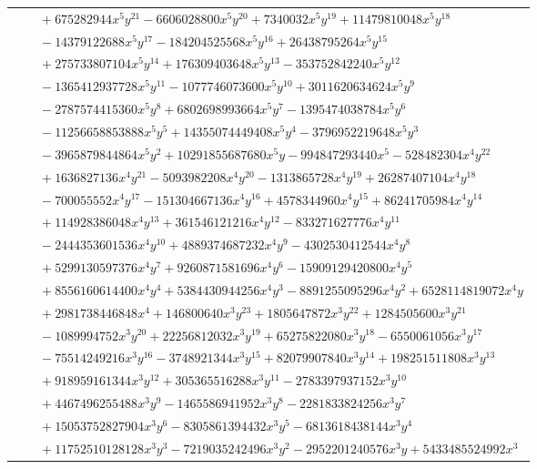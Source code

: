 \documentclass[11pt]{article}
\begin{document}
\begin{longtable}{@{}ll@{}}
 & $\quad +675282944x^{5}y^{21}-6606028800x^{5}y^{20}+7340032x^{5}y^{19}+11479810048x^{5}y^{18}$\\
 & $\quad -14379122688x^{5}y^{17}-184204525568x^{5}y^{16}+26438795264x^{5}y^{15}$\\
 & $\quad +275733807104x^{5}y^{14}+176309403648x^{5}y^{13}-353752842240x^{5}y^{12}$\\
 & $\quad -1365412937728x^{5}y^{11}-1077746073600x^{5}y^{10}+3011620634624x^{5}y^{9}$\\
 & $\quad -2787574415360x^{5}y^{8}+6802698993664x^{5}y^{7}-1395474038784x^{5}y^{6}$\\
 & $\quad -11256658853888x^{5}y^{5}+14355074449408x^{5}y^{4}-3796952219648x^{5}y^{3}$\\
 & $\quad -3965879844864x^{5}y^{2}+10291855687680x^{5}y-994847293440x^{5}-528482304x^{4}y^{22}$\\
 & $\quad +1636827136x^{4}y^{21}-5093982208x^{4}y^{20}-1313865728x^{4}y^{19}+26287407104x^{4}y^{18}$\\
 & $\quad -700055552x^{4}y^{17}-151304667136x^{4}y^{16}+4578344960x^{4}y^{15}+86241705984x^{4}y^{14}$\\
 & $\quad +114928386048x^{4}y^{13}+361546121216x^{4}y^{12}-833271627776x^{4}y^{11}$\\
 & $\quad -2444353601536x^{4}y^{10}+4889374687232x^{4}y^{9}-4302530412544x^{4}y^{8}$\\
 & $\quad +5299130597376x^{4}y^{7}+9260871581696x^{4}y^{6}-15909129420800x^{4}y^{5}$\\
 & $\quad +8556160614400x^{4}y^{4}+5384430944256x^{4}y^{3}-8891255095296x^{4}y^{2}+6528114819072x^{4}y$\\
 & $\quad +2981738446848x^{4}+146800640x^{3}y^{23}+1805647872x^{3}y^{22}+1284505600x^{3}y^{21}$\\
 & $\quad -1089994752x^{3}y^{20}+22256812032x^{3}y^{19}+65275822080x^{3}y^{18}-6550061056x^{3}y^{17}$\\
 & $\quad -75514249216x^{3}y^{16}-3748921344x^{3}y^{15}+82079907840x^{3}y^{14}+198251511808x^{3}y^{13}$\\
 & $\quad +918959161344x^{3}y^{12}+305365516288x^{3}y^{11}-2783397937152x^{3}y^{10}$\\
 & $\quad +4467496255488x^{3}y^{9}-1465586941952x^{3}y^{8}-2281833824256x^{3}y^{7}$\\
 & $\quad +15053752827904x^{3}y^{6}-8305861394432x^{3}y^{5}-6813618438144x^{3}y^{4}$\\
 & $\quad +11752510128128x^{3}y^{3}-7219035242496x^{3}y^{2}-2952201240576x^{3}y+5433485524992x^{3}$\\

\end{longtable}
\end{document}
